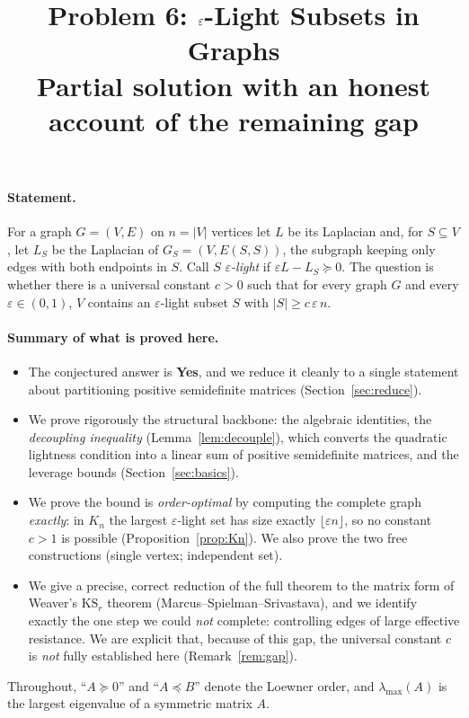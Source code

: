 \documentclass[12pt]{article}
\title{Problem 6: $\eps$-Light Subsets in Graphs\\
\large Partial solution with an honest account of the remaining gap}
\date{}
\theoremstyle{definition}
\newcommand{\eps}{\varepsilon}
\newcommand{\psd}{\succeq 0}
\begin{document}
\maketitle

\paragraph{Statement.}
For a graph $G=(V,E)$ on $n=|V|$ vertices let $L$ be its Laplacian and, for $S\subseteq V$, let
$L_S$ be the Laplacian of $G_S=(V,E(S,S))$, the subgraph keeping only edges with both endpoints in
$S$. Call $S$ \emph{$\eps$-light} if $\eps L-L_S\psd$. The question is whether there is a universal
constant $c>0$ such that for every graph $G$ and every $\eps\in(0,1)$, $V$ contains an $\eps$-light
subset $S$ with $|S|\ge c\,\eps\,n$.

\paragraph{Summary of what is proved here.}
\begin{itemize}
\item[(A)] The conjectured answer is \textbf{Yes}, and we reduce it cleanly to a single statement
about partitioning positive semidefinite matrices (Section~\ref{sec:reduce}).
\item[(B)] We prove rigorously the structural backbone: the algebraic identities, the
\emph{decoupling inequality} (Lemma~\ref{lem:decouple}), which converts the quadratic lightness
condition into a linear sum of positive semidefinite matrices, and the leverage bounds
(Section~\ref{sec:basics}).
\item[(C)] We prove the bound is \emph{order-optimal} by computing the complete graph \emph{exactly}:
in $K_n$ the largest $\eps$-light set has size exactly $\lfloor\eps n\rfloor$, so no constant $c>1$ is
possible (Proposition~\ref{prop:Kn}). We also prove the two free constructions (single vertex;
independent set).
\item[(D)] We give a precise, correct reduction of the full theorem to the matrix form of Weaver's
$\mathrm{KS}_r$ theorem (Marcus--Spielman--Srivastava), and we identify exactly the one step we could
\emph{not} complete: controlling edges of large effective resistance. We are explicit that, because
of this gap, the universal constant $c$ is \emph{not} fully established here
(Remark~\ref{rem:gap}).
\end{itemize}

Throughout, ``$A\psd$'' and ``$A\preceq B$'' denote the Loewner order, and $\lambda_{\max}(A)$ is the
largest eigenvalue of a symmetric matrix $A$.
\end{document}
